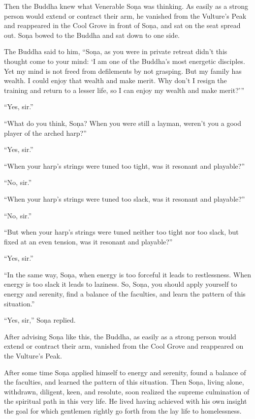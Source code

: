 \documentclass[12pt,openany]{book}%
\begin{document}
Then the Buddha knew what Venerable \textsanskrit{Soṇa} was thinking. As easily as a strong person would extend or contract their arm, he vanished from the Vulture’s Peak and reappeared in the Cool Grove in front of \textsanskrit{Soṇa}, and sat on the seat spread out. \textsanskrit{Soṇa} bowed to the Buddha and sat down to one side. 

The Buddha said to him, “\textsanskrit{Soṇa}, as you were in private retreat didn’t this thought come to your mind: ‘I am one of the Buddha’s most energetic disciples. Yet my mind is not freed from defilements by not grasping. But my family has wealth. I could enjoy that wealth and make merit. Why don’t I resign the training and return to a lesser life, so I can enjoy my wealth and make merit?’” 

“Yes, sir.” 

“What do you think, \textsanskrit{Soṇa}? When you were still a layman, weren’t you a good player of the arched harp?” 

“Yes, sir.” 

“When your harp’s strings were tuned too tight, was it resonant and playable?” 

“No, sir.” 

“When your harp’s strings were tuned too slack, was it resonant and playable?” 

“No, sir.” 

“But when your harp’s strings were tuned neither too tight nor too slack, but fixed at an even tension, was it resonant and playable?” 

“Yes, sir.” 

“In the same way, \textsanskrit{Soṇa}, when energy is too forceful it leads to restlessness. When energy is too slack it leads to laziness. So, \textsanskrit{Soṇa}, you should apply yourself to energy and serenity, find a balance of the faculties, and learn the pattern of this situation.” 

“Yes, sir,” \textsanskrit{Soṇa} replied. 

After advising \textsanskrit{Soṇa} like this, the Buddha, as easily as a strong person would extend or contract their arm, vanished from the Cool Grove and reappeared on the Vulture’s Peak. 

After some time \textsanskrit{Soṇa} applied himself to energy and serenity, found a balance of the faculties, and learned the pattern of this situation. Then \textsanskrit{Soṇa}, living alone, withdrawn, diligent, keen, and resolute, soon realized the supreme culmination of the spiritual path in this very life. He lived having achieved with his own insight the goal for which gentlemen rightly go forth from the lay life to homelessness. 
\end{document}
